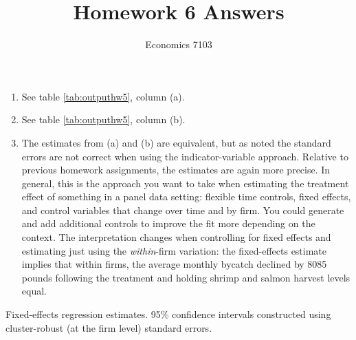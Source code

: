 \documentclass{article}
\title{Homework 6 Answers}
\author{Economics 7103}
\date{}
\begin{document}
  
\maketitle

\begin{enumerate}[label=(\alph*)]
    \item See table \ref{tab:outputhw5}, column (a).
    \item See table \ref{tab:outputhw5}, column (b).
    \item The estimates from (a) and (b) are equivalent, but as noted the standard errors are not correct when using the indicator-variable approach.  Relative to previous homework assignments, the estimates are again more precise.  In general, this is the approach you want to take when estimating the treatment effect of something in a panel data setting: flexible time controls, fixed effects, and control variables that change over time and by firm.  You could generate and add additional controls to improve the fit more depending on the context.  The interpretation changes when controlling for fixed effects and estimating just using the \textit{within}-firm variation: the fixed-effects estimate implies that within firms, the average monthly bycatch declined by 8085 pounds following the treatment and holding shrimp and salmon harvest levels equal.
\end{enumerate}

\begin{table}[h]
    \centering
    
    \caption{Fixed-effects regression estimates.  95\% confidence intervals constructed using cluster-robust (at the firm level) standard errors.}
    \label{tab:outputhw5}
\end{table}
\end{document}
